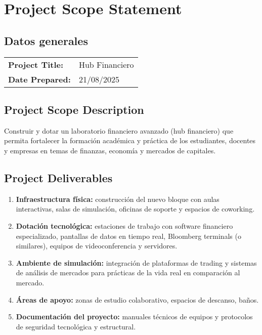 \section{Project Scope Statement}

\subsection{Datos generales}

\begin{tabularx}{\textwidth}{@{}lX@{}}
\textbf{Project Title:} & Hub Financiero \\
\textbf{Date Prepared:} & 21/08/2025 \\
\end{tabularx}

\subsection{Project Scope Description}

Construir y dotar un laboratorio financiero avanzado (hub financiero) que permita fortalecer la formación académica y práctica de los estudiantes, docentes y empresas en temas de finanzas, economía y mercados de capitales.

\subsection{Project Deliverables}

\begin{enumerate}
    \item \textbf{Infraestructura física:} construcción del nuevo bloque con aulas interactivas, salas de simulación, oficinas de soporte y espacios de coworking.
    \item \textbf{Dotación tecnológica:} estaciones de trabajo con software financiero especializado, pantallas de datos en tiempo real, Bloomberg terminals (o similares), equipos de videoconferencia y servidores.
    \item \textbf{Ambiente de simulación:} integración de plataformas de trading y sistemas de análisis de mercados para prácticas de la vida real en comparación al mercado.
    \item \textbf{Áreas de apoyo:} zonas de estudio colaborativo, espacios de descanso, baños.
    \item \textbf{Documentación del proyecto:} manuales técnicos de equipos y protocolos de seguridad tecnológica y estructural.
\end{enumerate}

